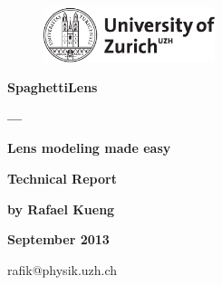 \begin{figure}[th]
		\includegraphics[width=5cm]{pic/uzh}
	\label{fig:logo}
\end{figure}

\begin{center}

\vspace{1cm}


{\Large\bf SpaghettiLens}

\vspace{.5cm}

{\Large\bf ---\\}

\vspace{.5cm}

{\Large\bf Lens modeling made easy}

\vspace{2cm}

{\Huge\bf Technical Report}

\vspace{\fill}

{\Large\bf by Rafael Kueng}
\vspace{1cm}

{\Large\bf September 2013} 
\vspace{1cm}

rafik@physik.uzh.ch

\end{center}
\newpage